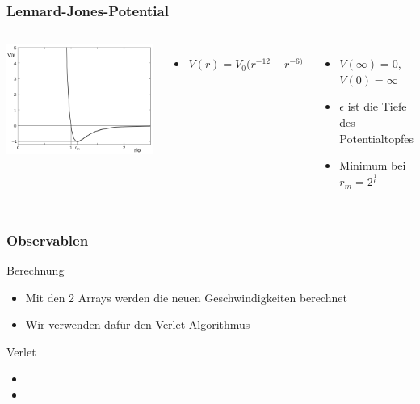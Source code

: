 \documentclass[11pt]{beamer}
\begin{document}
\begin{frame}
  \frametitle{Lennard-Jones-Potential}
   \vspace{-0.3cm}
  \begin{columns}
                \includegraphics[width=\textwidth]{img/LennardJonesPotential.png}
                \begin{itemize}
                \item ${V(r)=V_0 (r^{-12}-r^{-6)}}$ %
                \end{itemize}
        \pause
                \begin{itemize}
                \item $V(\infty)=0$, $V(0)=\infty$
                \item $\epsilon$ ist die Tiefe des Potentialtopfes
      			\item Minimum bei $r_{m}=2^{\frac{1}{6}}$ %
    			\end{itemize}
  \end{columns}
\end{frame}

\begin{frame}
  \frametitle{Observablen}
  \begin{block}{Berechnung}
    \begin{itemize}
      \item Mit den 2 Arrays werden die neuen Geschwindigkeiten berechnet
      \item Wir verwenden dafür den Verlet-Algorithmus
    \end{itemize}
  \end{block}
  \pause
   \begin{block}{Verlet}
    \begin{itemize}
      \item 
      \item 
    \end{itemize}
  \end{block}
\end{frame}
\end{document}
